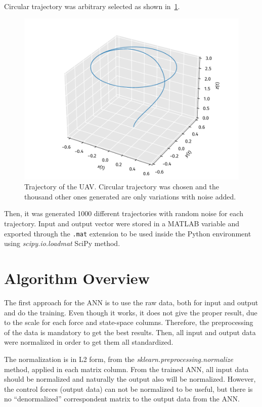 Circular trajectory was arbitrary selected as shown in~\cref{fig:trajectory}.
\begin{figure}[!htb]
    \centering
    \caption[Trajectory of the UAV]{Trajectory of the UAV. Circular trajectory was chosen and the thousand other ones generated are only variations with noise added.}
    \includegraphics{../codes/figures/trajectory.pdf}
    
    \label{fig:trajectory}
\end{figure}
Then, it was generated 1000 different trajectories with random noise for each trajectory.
Input and output vector were stored in a MATLAB variable and exported through the \texttt{.mat} extension to be used inside the Python environment using \emph{scipy.io.loadmat} SciPy method.


\section{Algorithm Overview}

The first approach for the ANN is to use the raw data, both for input and output and do the training.
Even though it works, it does not give the proper result, due to the scale for each force and state-space columns.
Therefore, the preprocessing of the data is mandatory to get the best results.
Then, all input and output data were normalized in order to get them all standardized.

The normalization is in L2 form, from the \emph{sklearn.preprocessing.normalize} method, applied in each matrix column.
From the trained ANN, all input data should be normalized and naturally the output also will be normalized.
However, the control forces (output data) can not be normalized to be useful, but there is no ``denormalized'' correspondent matrix to the output data from the ANN.

